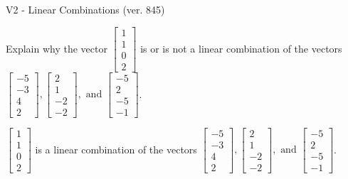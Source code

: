\begin{exercise}
  \begin{exerciseTitle}V2 - Linear Combinations (ver. 845)\end{exerciseTitle}
  \begin{exerciseStatement}
    Explain why the vector \(\left[\begin{array}{c}
1 \\
1 \\
0 \\
2
\end{array}\right]\)  is or is not a linear 
	combination of the vectors \(\left[\begin{array}{c}
-5 \\
-3 \\
4 \\
2
\end{array}\right] , \left[\begin{array}{c}
2 \\
1 \\
-2 \\
-2
\end{array}\right] , \text{ and } \left[\begin{array}{c}
-5 \\
2 \\
-5 \\
-1
\end{array}\right]\).
	


  \end{exerciseStatement}
  \begin{exerciseAnswer}
   \(\left[\begin{array}{c}
1 \\
1 \\
0 \\
2
\end{array}\right]\) 
  	 is  
	a linear combination of the vectors \(\left[\begin{array}{c}
-5 \\
-3 \\
4 \\
2
\end{array}\right] , \left[\begin{array}{c}
2 \\
1 \\
-2 \\
-2
\end{array}\right] , \text{ and } \left[\begin{array}{c}
-5 \\
2 \\
-5 \\
-1
\end{array}\right]\).

	
  


  \end{exerciseAnswer}
\end{exercise}